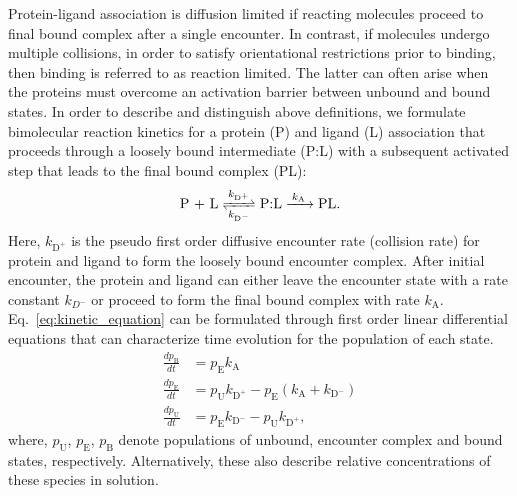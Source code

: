 \documentclass[../talant.diss.submit.tex]{subfiles}
\begin{document}
Protein-ligand association is diffusion limited if reacting molecules proceed to
final bound complex after a single encounter. In contrast, if molecules undergo
multiple collisions, in order to satisfy orientational restrictions prior to
binding, then binding is referred to as reaction limited. The latter can often
arise when the proteins must overcome an activation barrier between unbound and
bound states.  In order to describe and distinguish above definitions, we formulate
bimolecular reaction kinetics for a protein (P) and ligand (L) association that
proceeds through a loosely bound intermediate (P:L) with a subsequent activated
step that leads to the final bound complex (PL):
%
%
\begin{equation}
  \label{eq:kinetic_equation}
  \ce{
    \mbox{P + L} <=>[$k_{\mathrm{{D}^{+}}}$][$k_{\mathrm{{D}^{-}}}$] \mbox{P:L}
    ->[$k_\mathrm{A}$] \mbox{PL}
  }.
\end{equation}
%
%
Here, $k_{\mathrm{D}^+}$ is the pseudo first order diffusive encounter rate (collision rate) for protein
and ligand to form the loosely bound encounter complex. After initial encounter, the protein and ligand can
either leave the encounter state with a rate constant $k_{D^{-}}$ or proceed to form the final bound
complex with rate $k_\mathrm{A}$. Eq.~\ref{eq:kinetic_equation} can be formulated through first order
linear differential equations that can characterize time evolution for the population of each state.
%
%
\begin{align}
  \label{SystemODE}
  \frac{dp_{\mathrm{B}}}{dt} & = p_{\mathrm{E}} k_{\mathrm{A}} \nonumber \\
  \frac{dp_{\mathrm{E}}}{dt} & = p_{\mathrm{U}} k_{\mathrm{{{D}^{+}}}}  - p_{\mathrm{E}} (k_{\mathrm{A}} + k_{\mathrm{D}^{-}}) \\
  \frac{dp_{\mathrm{U}}}{dt} & = p_{\mathrm{E}} k_{\mathrm{D}^{-}}  -  p_{\mathrm{U}} k_{\mathrm{D}^{+}} \nonumber,     
\end{align}       
%
%
where, $p_{\mathrm{U}}$, $p_{\mathrm{E}}$, $p_{\mathrm{B}}$ denote populations
of unbound, encounter complex and bound states, respectively. Alternatively, these 
also describe relative concentrations of these species in solution.
\end{document}
